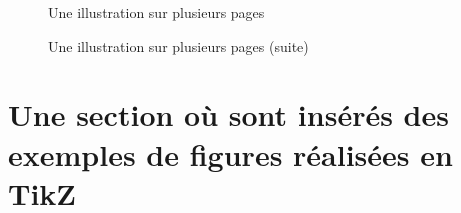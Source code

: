 \begin{figure}[p]
\caption{Une illustration sur plusieurs pages}
\label{fig:exemplelong}
\end{figure}
\begin{figure}[p]
\ContinuedFloat %
\captionsetup{list=no} %
\caption{Une illustration sur plusieurs pages (suite)}
\end{figure}

\lipsum[16]

\lipsum[17]

\lipsum[18]

\lipsum[19]

\section[Un peu de TikZ]{Une section où sont insérés des exemples de figures réalisées en TikZ}\label{sec:23}

\lipsum[18]

